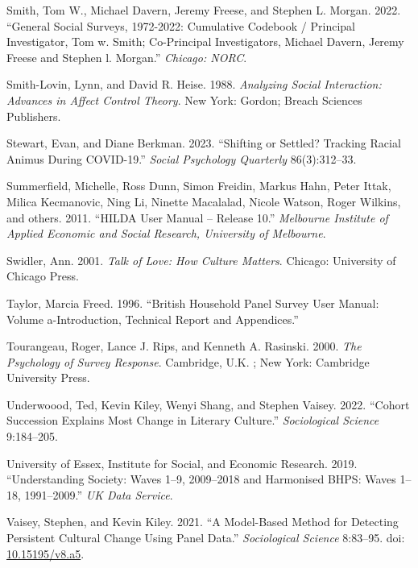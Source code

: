 \documentclass[
  12pt,
]{article}
\newlength{\cslhangindent}
\newlength{\cslentryspacingunit} %
\newenvironment{CSLReferences}[2] %
 {%
  \setlength{\parindent}{0pt}
  \ifodd #1
  \let\oldpar\par
  \def\par{\hangindent=\cslhangindent\oldpar}
  \fi
  \setlength{\parskip}{#2\cslentryspacingunit}
 }%
 {}
\begin{document}
\begin{CSLReferences}{1}{0}
\leavevmode{}%
Smith, Tom W., Michael Davern, Jeremy Freese, and Stephen L. Morgan.
2022. {``General Social Surveys, 1972-2022: Cumulative Codebook /
Principal Investigator, Tom w. Smith; Co-Principal Investigators,
Michael Davern, Jeremy Freese and Stephen l. Morgan.''} \emph{Chicago:
NORC}.

\leavevmode{}%
Smith-Lovin, Lynn, and David R. Heise. 1988. \emph{Analyzing {Social}
{Interaction}: {Advances} in {Affect} {Control} {Theory}}. New York:
Gordon; Breach Sciences Publishers.

\leavevmode{}%
Stewart, Evan, and Diane Berkman. 2023. {``Shifting or Settled? Tracking
Racial Animus During COVID-19.''} \emph{Social Psychology Quarterly}
86(3):312--33.

\leavevmode{}%
Summerfield, Michelle, Ross Dunn, Simon Freidin, Markus Hahn, Peter
Ittak, Milica Kecmanovic, Ning Li, Ninette Macalalad, Nicole Watson,
Roger Wilkins, and others. 2011. {``HILDA User Manual -- Release 10.''}
\emph{Melbourne Institute of Applied Economic and Social Research,
University of Melbourne}.

\leavevmode{}%
Swidler, Ann. 2001. \emph{Talk of {Love}: {How} {Culture} {Matters}}.
Chicago: University of Chicago Press.

\leavevmode{}%
Taylor, Marcia Freed. 1996. {``British Household Panel Survey User
Manual: Volume a-Introduction, Technical Report and Appendices.''}

\leavevmode{}%
Tourangeau, Roger, Lance J. Rips, and Kenneth A. Rasinski. 2000.
\emph{The Psychology of Survey Response}. Cambridge, U.K. ; New York:
Cambridge University Press.

\leavevmode{}%
Underwoood, Ted, Kevin Kiley, Wenyi Shang, and Stephen Vaisey. 2022.
{``Cohort Succession Explains Most Change in Literary Culture.''}
\emph{Sociological Science} 9:184--205.

\leavevmode{}%
University of Essex, Institute for Social, and Economic Research. 2019.
{``Understanding Society: Waves 1--9, 2009--2018 and Harmonised BHPS:
Waves 1--18, 1991--2009.''} \emph{UK Data Service}.

\leavevmode{}%
Vaisey, Stephen, and Kevin Kiley. 2021. {``A {Model}-{Based} {Method}
for {Detecting} {Persistent} {Cultural} {Change} {Using} {Panel}
{Data}.''} \emph{Sociological Science} 8:83--95. doi:
\href{https://doi.org/10.15195/v8.a5}{10.15195/v8.a5}.


\end{CSLReferences}
\end{document}
